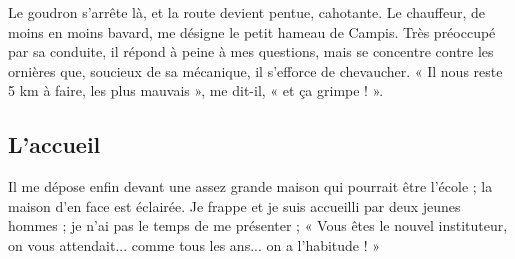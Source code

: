 Le goudron s'arrête là, et la route devient pentue, cahotante. Le chauffeur, de moins en moins bavard, me désigne le petit hameau de Campis. Très préoccupé par sa conduite, il répond à peine à mes questions, mais se concentre contre les ornières que, soucieux de sa mécanique, il s'efforce de chevaucher. « Il nous reste 5 km à faire, les plus mauvais », me dit-il, « et ça grimpe ! ».

\subsection*{L'accueil}

Il me dépose enfin devant une assez grande maison qui pourrait être l'école ; la maison d'en face est éclairée. Je frappe et je suis accueilli par deux jeunes hommes ; je n'ai pas le temps de me présenter ; « Vous êtes le nouvel instituteur, on vous attendait... comme tous les ans... on a l'habitude ! »
